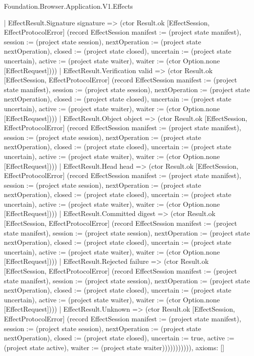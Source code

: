 \begin{lexlean}{Foundation.Browser.Application.V1.Effects}
\begin{semanticmodule}
{                  | EffectResult.Signature signature => (ctor Result.ok [EffectSession, EffectProtocolError] (record EffectSession {manifest := (project state manifest), session := (project state session), nextOperation := (project state nextOperation), closed := (project state closed), uncertain := (project state uncertain), active := (project state waiter), waiter := (ctor Option.none [EffectRequest])}))
                  | EffectResult.Verification valid => (ctor Result.ok [EffectSession, EffectProtocolError] (record EffectSession {manifest := (project state manifest), session := (project state session), nextOperation := (project state nextOperation), closed := (project state closed), uncertain := (project state uncertain), active := (project state waiter), waiter := (ctor Option.none [EffectRequest])}))
                  | EffectResult.Object object => (ctor Result.ok [EffectSession, EffectProtocolError] (record EffectSession {manifest := (project state manifest), session := (project state session), nextOperation := (project state nextOperation), closed := (project state closed), uncertain := (project state uncertain), active := (project state waiter), waiter := (ctor Option.none [EffectRequest])}))
                  | EffectResult.Head head => (ctor Result.ok [EffectSession, EffectProtocolError] (record EffectSession {manifest := (project state manifest), session := (project state session), nextOperation := (project state nextOperation), closed := (project state closed), uncertain := (project state uncertain), active := (project state waiter), waiter := (ctor Option.none [EffectRequest])}))
                  | EffectResult.Committed digest => (ctor Result.ok [EffectSession, EffectProtocolError] (record EffectSession {manifest := (project state manifest), session := (project state session), nextOperation := (project state nextOperation), closed := (project state closed), uncertain := (project state uncertain), active := (project state waiter), waiter := (ctor Option.none [EffectRequest])}))
                  | EffectResult.Rejected failure => (ctor Result.ok [EffectSession, EffectProtocolError] (record EffectSession {manifest := (project state manifest), session := (project state session), nextOperation := (project state nextOperation), closed := (project state closed), uncertain := (project state uncertain), active := (project state waiter), waiter := (ctor Option.none [EffectRequest])}))
                  | EffectResult.Unknown => (ctor Result.ok [EffectSession, EffectProtocolError] (record EffectSession {manifest := (project state manifest), session := (project state session), nextOperation := (project state nextOperation), closed := (project state closed), uncertain := true, active := (project state active), waiter := (project state waiter)})))))))))),
  axioms: []
}


\end{semanticmodule}
\end{lexlean}
